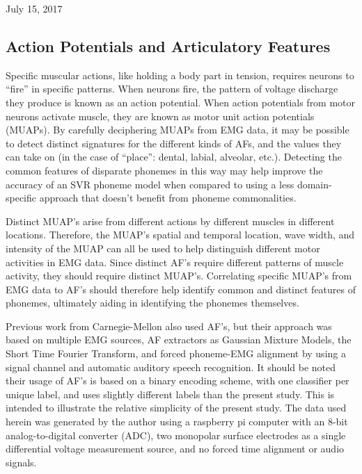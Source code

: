 \documentclass[conference]{IEEEtran}
\begin{document}

\hfill July 15, 2017

\subsection{Action Potentials and Articulatory Features}
Specific muscular actions, like holding a body part in tension, requires neurons to “fire” in specific patterns. When neurons fire, the pattern of voltage discharge they produce is known as an action potential. When action potentials from motor neurons activate muscle, they are known as motor unit action potentials (MUAPs). \cite{EMG} By carefully deciphering MUAPs from EMG data, it may be possible to detect distinct signatures for the different kinds of AFs, and the values they can take on (in the case of “place”: dental, labial, alveolar, etc.). Detecting the common features of disparate phonemes in this way may help improve the accuracy of an SVR phoneme model when compared to using a less domain-specific approach that doesn't benefit from phoneme commonalities.

Distinct MUAP's arise from different actions by different muscles in different locations. Therefore, the MUAP's spatial and temporal location, wave width, and intensity of the MUAP can all be used to help distinguish different motor activities in EMG data. Since distinct AF's require different patterns of muscle activity, they should require distinct MUAP's. Correlating specific MUAP's from EMG data to AF's should therefore help identify common and distinct features of phonemes, ultimately aiding in identifying the phonemes themselves.

Previous work from Carnegie-Mellon also used AF's, but their approach was based on multiple EMG sources, AF extractors as Gaussian Mixture Models, the Short Time Fourier Transform, and forced phoneme-EMG alignment by using a signal channel and automatic auditory speech recognition. It should be noted their usage of AF's is based on a binary encoding scheme, with one classifier per unique label, and uses slightly different labels than the present study. This is intended to illustrate the relative simplicity of the present study. The data used herein was generated by the author using a raspberry pi computer with an 8-bit analog-to-digital converter (ADC), two monopolar surface electrodes as a single differential voltage measurement source, and no forced time alignment or audio signals.
\end{document}
